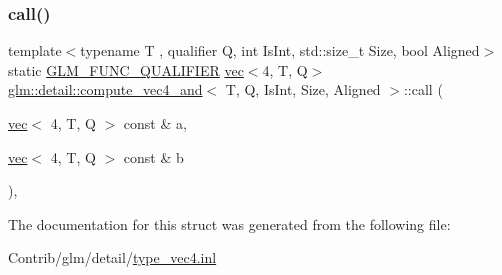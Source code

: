 \subsubsection{\texorpdfstring{call()}{call()}}
{\footnotesize\ttfamily template$<$typename T , qualifier Q, int Is\+Int, std\+::size\+\_\+t Size, bool Aligned$>$ \\
static \mbox{\hyperlink{setup_8hpp_a33fdea6f91c5f834105f7415e2a64407}{G\+L\+M\+\_\+\+F\+U\+N\+C\+\_\+\+Q\+U\+A\+L\+I\+F\+I\+ER}} \mbox{\hyperlink{structglm_1_1vec}{vec}}$<$4, T, Q$>$ \mbox{\hyperlink{structglm_1_1detail_1_1compute__vec4__and}{glm\+::detail\+::compute\+\_\+vec4\+\_\+and}}$<$ T, Q, Is\+Int, Size, Aligned $>$\+::call (\begin{DoxyParamCaption}\item[{\mbox{\hyperlink{structglm_1_1vec}{vec}}$<$ 4, T, Q $>$ const \&}]{a,  }\item[{\mbox{\hyperlink{structglm_1_1vec}{vec}}$<$ 4, T, Q $>$ const \&}]{b }\end{DoxyParamCaption})\hspace{0.3cm}{\ttfamily [inline]}, {\ttfamily [static]}}



The documentation for this struct was generated from the following file\+:\begin{DoxyCompactItemize}
\item 
Contrib/glm/detail/\mbox{\hyperlink{type__vec4_8inl}{type\+\_\+vec4.\+inl}}\end{DoxyCompactItemize}
